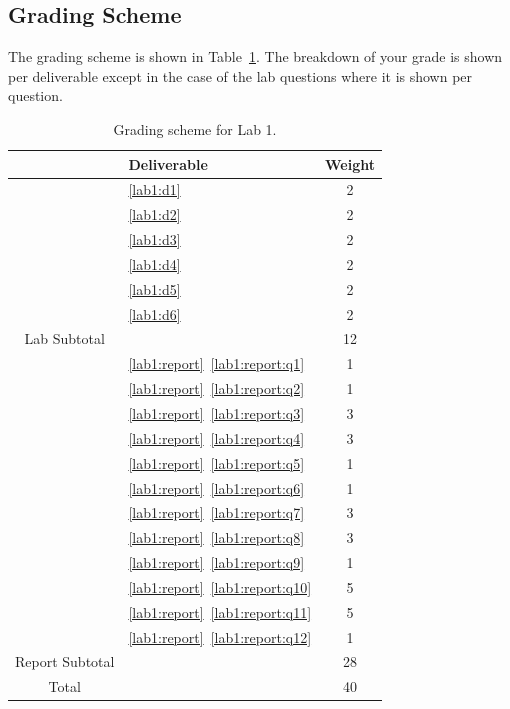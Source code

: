 \subsection{Grading Scheme}
The grading scheme is shown in Table~\ref{tab:lab1:grading}. The breakdown of
your grade is shown per deliverable except in the case of the lab
questions where it is shown per question.
%
\begin{table}
\centering
\begin{tabular}{c|l|c}
        & Deliverable           & Weight  \\ \hline
        & \ref{lab1:d1}         & 2       \\ \hline
        & \ref{lab1:d2}         & 2       \\ \hline
        & \ref{lab1:d3}         & 2       \\ \hline
        & \ref{lab1:d4}         & 2       \\ \hline
        & \ref{lab1:d5}         & 2       \\ \hline
        & \ref{lab1:d6}         & 2       \\ \hhline{=|=|=}
Lab Subtotal&                       & 12      \\ \hhline{=|=|=}
        & \ref{lab1:report}~\ref{lab1:report:q1}  & 1       \\ \hline
        & \ref{lab1:report}~\ref{lab1:report:q2}  & 1       \\ \hline
        & \ref{lab1:report}~\ref{lab1:report:q3}  & 3       \\ \hline
        & \ref{lab1:report}~\ref{lab1:report:q4}  & 3       \\ \hline
        & \ref{lab1:report}~\ref{lab1:report:q5}  & 1       \\ \hline
        & \ref{lab1:report}~\ref{lab1:report:q6}  & 1       \\ \hline
        & \ref{lab1:report}~\ref{lab1:report:q7}  & 3       \\ \hline
        & \ref{lab1:report}~\ref{lab1:report:q8}  & 3       \\ \hline
        & \ref{lab1:report}~\ref{lab1:report:q9}  & 1       \\ \hline
        & \ref{lab1:report}~\ref{lab1:report:q10} & 5       \\ \hline
        & \ref{lab1:report}~\ref{lab1:report:q11} & 5       \\ \hline
        & \ref{lab1:report}~\ref{lab1:report:q12} & 1       \\ \hhline{=|=|=}
Report Subtotal&  & 28 \\ \hhline{=|=|=}
  Total &                       & 40
\end{tabular}
\caption[Grading Scheme for Lab 1]{Grading scheme for Lab 1.}
\label{tab:lab1:grading}
\end{table}
%
